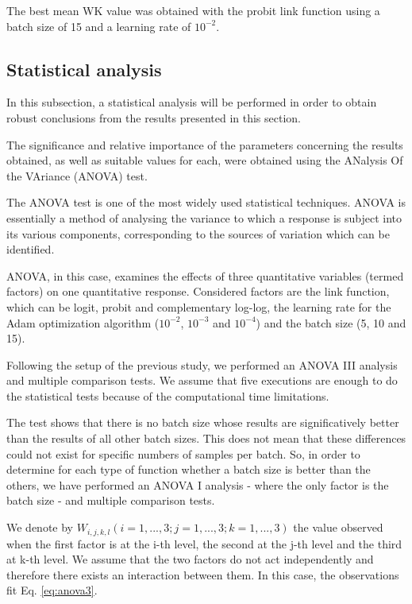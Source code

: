 \documentclass[10pt, a4paper, titlepage, twocolumn]{article}
\begin{document}
	The best mean WK value was obtained with the probit link function using a batch size of 15 and a learning rate of $10^{-2}$.
	
	\subsection{Statistical analysis}
	In this subsection, a statistical analysis will be performed in order to obtain robust conclusions from the results presented in this section.
	
	The significance and relative importance of the parameters concerning the results obtained, as well as suitable values for each, were obtained using the ANalysis Of the VAriance (ANOVA) test.
	
	The ANOVA test \cite{miller1997beyond} is one of the most widely used statistical techniques. ANOVA is essentially a method of analysing the variance to which a response is subject into its various components, corresponding to the sources of variation which can be identified.
	
	ANOVA, in this case, examines the effects of three quantitative variables (termed factors) on one quantitative response. Considered factors are the link function, which can be logit, probit and complementary log-log, the learning rate for the Adam optimization algorithm ($10^{-2}$, $10^{-3}$ and $10^{-4}$) and the batch size (5, 10 and 15).
	
	Following the setup of the previous study, we performed an ANOVA III analysis and multiple comparison tests. We assume that five executions are enough to do the statistical tests because of the computational time limitations.
	
	The test shows that there is no batch size whose results are significatively better than the results of all other batch sizes. This does not mean that these differences could not exist for specific numbers of samples per batch. So, in order to determine for each type of function whether a batch size is better than the others, we have performed an ANOVA I analysis - where the only factor is the batch size - and multiple comparison tests.
	
	We denote by $W_{i,j,k,l}(i=1, ..., 3; j = 1, ..., 3; k = 1, ..., 3)$ the value observed when the first factor is at the i-th level, the second at the j-th level and the third at k-th level. We assume that the two factors do not act independently and therefore there exists an interaction between them. In this case, the observations fit Eq. \ref{eq:anova3}.
	
\end{document}
